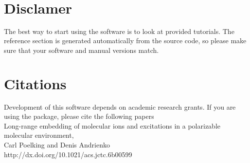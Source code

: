 \begin{titlepage}


\vspace*{1cm}

\vspace*{3cm}
\vspace*{1cm}
\vfill

\vspace*{0.5cm}
\center{\large{\today}} \\
\vspace*{0.3cm}
\end{titlepage}

\section*{Disclamer}
The best way to start using the software is to look at provided tutorials. The reference section is generated automatically from the source code, so please make sure that your software and manual versions match.  

\section*{Citations}
Development of this software depends on academic research grants. If you are using the package, please cite the  following papers \\

\vspace{0.1cm}
\noindent
\cite{poelking_long-range_2016} Long-range embedding of molecular ions and excitations in a polarizable molecular environment, \\
Carl Poelking and Denis Andrienko \\
{http://dx.doi.org/10.1021/acs.jctc.6b00599} \\

